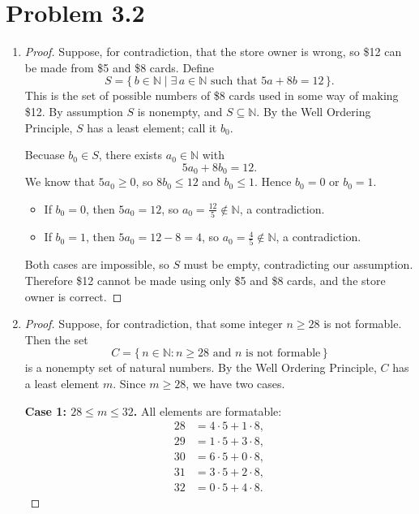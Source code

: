 \documentclass[12pt]{article}
\begin{document}
\section*{Problem 3.2}
\begin{enumerate}[label=\alph*)]
  \item\begin{proof}
  Suppose, for contradiction, that the store owner is wrong, so \$12 can be made
  from \$5 and \$8 cards. Define
  \[
    S=\{\, b\in\mathbb{N} \mid \exists\, a\in\mathbb{N} \text{ such that } 5a+8b=12 \,\}.
  \]
  This is the set of possible numbers of \$8 cards used in some way of making \$12.
  By assumption $S$ is nonempty, and $S\subseteq\mathbb{N}$. By the Well Ordering
  Principle, $S$ has a least element; call it $b_0$.

  Becuase $b_0\in S$, there exists $a_0\in\mathbb{N}$ with
  \[
    5a_0+8b_0=12.
  \]
  We know that $5a_0\ge 0$, so $8b_0\le 12$ and $b_0\le 1$. Hence $b_0=0$
  or $b_0=1$.

  \begin{itemize}
    \item If $b_0=0$, then $5a_0=12$, so $a_0=\tfrac{12}{5}\notin\mathbb{N}$,
      a contradiction.
    \item If $b_0=1$, then $5a_0=12-8=4$, so $a_0=\tfrac{4}{5}\notin\mathbb{N}$,
      a contradiction.
  \end{itemize}

  Both cases are impossible, so $S$ must be empty, contradicting our assumption.
  Therefore \$12 cannot be made using only \$5 and \$8 cards, and the store
  owner is correct.
\end{proof}

    \item \begin{proof}
Suppose, for contradiction, that some integer $n \ge 28$ is not formable. Then the set
\[
  C = \{\, n \in \mathbb{N} : n \ge 28 \text{ and } n \text{ is not formable} \,\}
\]
is a nonempty set of natural numbers. By the Well Ordering Principle, $C$ has a least element $m$. Since $m \ge 28$, we have two cases.

\medskip
\noindent\textbf{Case 1: $28 \le m \le 32$.} All elements are formatable:
\begin{align*}
  28 &= 4\cdot 5 + 1\cdot 8, \\
  29 &= 1\cdot 5 + 3\cdot 8, \\
  30 &= 6\cdot 5 + 0\cdot 8, \\
  31 &= 3\cdot 5 + 2\cdot 8, \\
  32 &= 0\cdot 5 + 4\cdot 8.
\end{align*}



\end{proof}
\end{enumerate}
\end{document}
